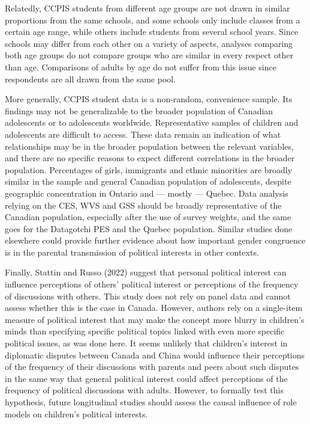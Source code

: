 \documentclass[
  letterpaper,
  DIV=11,
  numbers=noendperiod]{scrreprt}
\begin{document}
Relatedly, CCPIS students from different age groups are not drawn in
similar proportions from the same schools, and some schools only include
classes from a certain age range, while others include students from
several school years. Since schools may differ from each other on a
variety of aspects, analyses comparing both age groups do not compare
groups who are similar in every respect other than age. Comparisons of
adults by age do not suffer from this issue since respondents are all
drawn from the same pool.

More generally, CCPIS student data is a non-random, convenience sample.
Its findings may not be generalizable to the broader population of
Canadian adolescents or to adolescents worldwide. Representative samples
of children and adolescents are difficult to access. These data remain
an indication of what relationships may be in the broader population
between the relevant variables, and there are no specific reasons to
expect different correlations in the broader population. Percentages of
girls, immigrants and ethnic minorities are broadly similar in the
sample and general Canadian population of adolescents, despite
geographic concentration in Ontario and --- mostly --- Quebec. Data
analysis relying on the CES, WVS and GSS should be broadly
representative of the Canadian population, especially after the use of
survey weights, and the same goes for the Datagotchi PES and the Quebec
population. Similar studies done elsewhere could provide further
evidence about how important gender congruence is in the parental
transmission of political interests in other contexts.

Finally, Stattin and Russo (2022) suggest that personal political
interest can influence perceptions of others' political interest or
perceptions of the frequency of discussions with others. This study does
not rely on panel data and cannot assess whether this is the case in
Canada. However, authors rely on a single-item measure of political
interest that may make the concept more blurry in children's minds than
specifying specific political topics linked with even more specific
political issues, as was done here. It seems unlikely that children's
interest in diplomatic disputes between Canada and China would influence
their perceptions of the frequency of their discussions with parents and
peers about such disputes in the same way that general political
interest could affect perceptions of the frequency of political
discussions with adults. However, to formally test this hypothesis,
future longitudinal studies should assess the causal influence of role
models on children's political interests.
\end{document}
